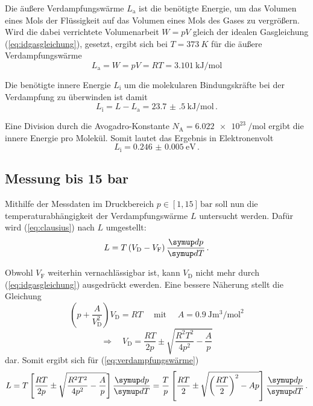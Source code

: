 Die äußere Verdampfungswärme $L_\text{a}$ ist die benötigte Energie, 
um das Volumen eines Mols der Flüssigkeit auf das Volumen eines Mols des Gases zu vergrößern.
Wird die dabei verrichtete Volumenarbeit $W = pV$  gleich der idealen Gasgleichung (\ref{eq:idgasgleichung}),
gesetzt, ergibt sich bei $T = \qty{373}{K}$ für die äußere Verdampfungswärme
\begin{equation}
    L_{\text{a}} = W = pV = RT = \qty{3.101}{\kilo\joule\per\mol}
\end{equation}

Die benötigte innere Energie $L_\text{i}$ um die molekularen Bindungskräfte bei der Verdampfung zu überwinden ist damit
\begin{equation}
    L_{\mathrm{i}} = L-L_{\mathrm{a}} = \qty{23.7(5)}{\kilo\joule\per\mol} \, .
\end{equation}

Eine Division durch die Avogadro-Konstante $N_\text{A} = \qty[per-mode=reciprocal]{6.022e23}{\per\mol}$
ergibt die innere Energie pro Molekül. Somit lautet das Ergebnis in Elektronenvolt
\begin{equation}
    L_{\text{i}} = \qty{0.246(5)}{\eV} \, .
\end{equation}


\subsection{Messung bis 15 bar}

Mithilfe der Messdaten im Druckbereich $p \in [1, 15] \, \mathrm{bar}$ soll nun die temperaturabhängigkeit
der Verdampfungswärme $L$ untersucht werden. Dafür wird (\ref{eq:clausius}) nach $L$ umgestellt:
\begin{equation}
    L = T \left(V_{\text{D}} - V_{\text{F}}\right) \frac {\dif{p}} {\dif{T}} \, . \label{eq:verdampfungswärme}
\end{equation}

Obwohl $V_\text{F}$ weiterhin vernachlässigbar ist, kann $V_\text{D}$ nicht mehr durch (\ref{eq:idgasgleichung})
ausgedrückt ewerden.
Eine bessere Näherung stellt die Gleichung
\begin{equation}
    \left(p + \frac {A} {V_{\text{D}}^{2}}\right) V_{\text{D}} = RT 
    \quad \text { mit } \quad
    A = \qty[per-mode=fraction]{0.9}{\joule\m\cubed\per\mol\squared} 
\end{equation}
\begin{equation}
    \Rightarrow \quad V_{\text{D}} = \frac{RT}{2p} \pm \sqrt{ \frac {R^{2} T^{2}} {4 p^{2}} - \frac{A}{p} } 
\end{equation}
dar. Somit ergibt sich für (\ref{eq:verdampfungswärme}) 
\begin{equation}
    L = T\left[\frac{R T}{2 p} \pm \sqrt{\frac{R^{2} T^{2}}{4 p^{2}}-\frac{A}{p}}\right] \frac{\dif{p}}{\dif{T}} 
    = \frac{T}{p} \left[\frac{R T}{2} \pm \sqrt{\left(\frac{R T}{2}\right)^{2}-A p}\right] \frac{\dif{p}}{\dif{T}} \, .
    \label{eq:L}
\end{equation}

